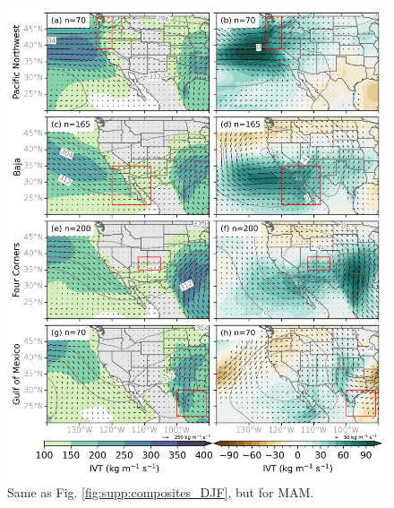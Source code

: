 \documentclass[jgrga]{agutexSI2019}
\begin{document}
\begin{article}
\begin{figure}
\noindent\includegraphics[scale=0.8]{figS8.png}
\caption{Same as Fig. \ref{fig:supp:composites_DJF}, but for MAM.}
\label{fig:supp:composites_MAM}
\end{figure}
\clearpage


\end{article}
\end{document}
